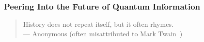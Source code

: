 
\begin{frame}
  \frametitle{Peering Into the Future of Quantum Information}
  \mbox{}%
  \vfill
  \begin{quote}
    History does not repeat itself, but it often rhymes. \\%
    \mbox{}\hfill --- Anonymous (often misattributed to Mark Twain~\cite{QI-History-Rhymes})
  \end{quote}
  \vfill %
  \mbox{}
\end{frame}
